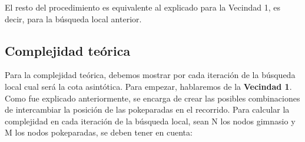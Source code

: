 	\par El resto del procedimiento es equivalente al explicado para la Vecindad 1, es decir, para la búsqueda local anterior.
   
    \subsection{Complejidad teórica}
        Para la complejidad teórica, debemos mostrar por cada iteración de la búsqueda local cual será la cota asintótica. Para empezar, hablaremos de la \textbf{Vecindad 1}. Como fue explicado anteriormente, se encarga de crear las posibles combinaciones de intercambiar la posición de las pokeparadas en el recorrido. Para calcular la complejidad en cada iteración de la búsqueda local, sean N los nodos gimnasio y M los nodos pokeparadas, se deben tener en cuenta:

